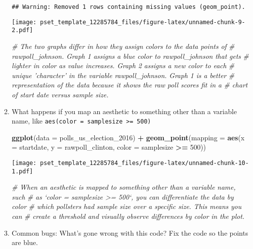 \documentclass[
]{article}
\newenvironment{Shaded}{\begin{snugshade}}{\end{snugshade}}
\newcommand{\CommentTok}[1]{\textcolor[rgb]{0.56,0.35,0.01}{\textit{#1}}}
\newcommand{\DataTypeTok}[1]{\textcolor[rgb]{0.13,0.29,0.53}{#1}}
\newcommand{\DecValTok}[1]{\textcolor[rgb]{0.00,0.00,0.81}{#1}}
\newcommand{\KeywordTok}[1]{\textcolor[rgb]{0.13,0.29,0.53}{\textbf{#1}}}
\newcommand{\NormalTok}[1]{#1}
\newcommand{\OperatorTok}[1]{\textcolor[rgb]{0.81,0.36,0.00}{\textbf{#1}}}
\newcommand{\StringTok}[1]{\textcolor[rgb]{0.31,0.60,0.02}{#1}}
\begin{document}
\begin{enumerate}
\begin{verbatim}
## Warning: Removed 1 rows containing missing values (geom_point).
\end{verbatim}

  \texttt{[image: pset\_template\_12285784\_files/figure-latex/unnamed-chunk-9-2.pdf]}

\begin{Shaded}
\begin{Highlighting}[]
\CommentTok{# The two graphs differ in how they assign colors to the data points of}
\CommentTok{# rawpoll_johnson. Graph 1 assigns a blue color to rawpoll_johnson that gets}
\CommentTok{# lighter in color as value increases. Graph 2 assigns a new color to each }
\CommentTok{# unique 'character' in the variable rawpoll_johnson. Graph 1 is a better}
\CommentTok{# representation of the data because it shows the raw poll scores fit in a }
\CommentTok{# chart of start date versus sample size.}
\end{Highlighting}
\end{Shaded}
\item
  What happens if you map an aesthetic to something other than a
  variable name, like
  \texttt{aes(color\ =\ samplesize\ \textgreater{}=\ 500)}

\begin{Shaded}
\begin{Highlighting}[]
\KeywordTok{ggplot}\NormalTok{(}\DataTypeTok{data =}\NormalTok{ polls_us_election_}\DecValTok{2016}\NormalTok{) }\OperatorTok{+}
\StringTok{  }\KeywordTok{geom_point}\NormalTok{(}\DataTypeTok{mapping =} \KeywordTok{aes}\NormalTok{(}\DataTypeTok{x =}\NormalTok{ startdate, }
                           \DataTypeTok{y =}\NormalTok{ rawpoll_clinton, }
                           \DataTypeTok{color =}\NormalTok{ samplesize }\OperatorTok{>=}\StringTok{ }\DecValTok{500}\NormalTok{))}
\end{Highlighting}
\end{Shaded}

  \texttt{[image: pset\_template\_12285784\_files/figure-latex/unnamed-chunk-10-1.pdf]}

\begin{Shaded}
\begin{Highlighting}[]
\CommentTok{# When an aesthetic is mapped to something other than a variable name, such }
\CommentTok{# as `color = samplesize >= 500`, you can differentiate the data by color }
\CommentTok{# which pollsters had sample size over a specific size. This means you can }
\CommentTok{# create a threshold and visually observe differences by color in the plot.}
\end{Highlighting}
\end{Shaded}
\item
  Common bugs: What's gone wrong with this code? Fix the code so the
  points are blue.


\end{enumerate}
\end{document}
